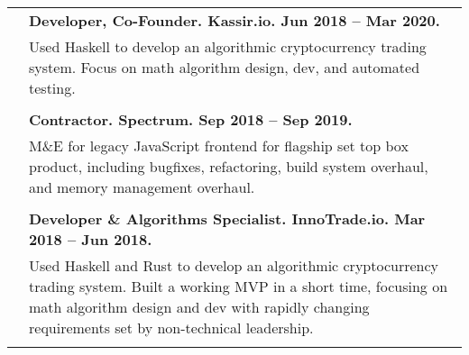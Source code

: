 \documentclass{article}
\begin{document}
\begin{tabular}{rl}
  & {\bf Developer, Co-Founder. Kassir.io. Jun 2018 -- Mar 2020.} \\
  & \parbox{4.5in}{Used Haskell to develop an algorithmic cryptocurrency trading system. Focus on math algorithm design, dev, and automated testing.} \\ \\

  & {\bf Contractor. Spectrum. Sep 2018 -- Sep 2019.} \\
  & \parbox{4.5in}{M\&E for legacy JavaScript frontend for flagship set top box product, including bugfixes, refactoring, build system overhaul, and memory management overhaul.} \\ \\

  & {\bf Developer \& Algorithms Specialist. InnoTrade.io. Mar 2018 -- Jun 2018.} \\
  & \parbox{4.5in}{Used Haskell and Rust to develop an algorithmic cryptocurrency trading system. Built a working MVP in a short time, focusing on math algorithm design and dev with rapidly changing requirements set by non-technical leadership.} \\ \\
\end{tabular}
\end{document}
